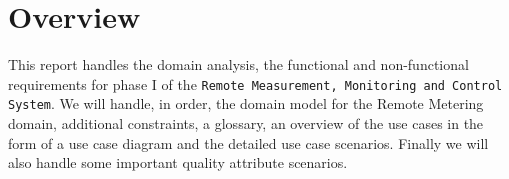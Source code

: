 \section{Overview}
This report handles the domain analysis, the functional and non-functional requirements for phase I of the \texttt{Remote Measurement, Monitoring and Control System}.
We will handle, in order, the domain model for the Remote Metering domain, additional constraints, a glossary, 
an overview of the use cases in the form of a use case diagram and the detailed use case scenarios.
Finally we will also handle some important quality attribute scenarios.

